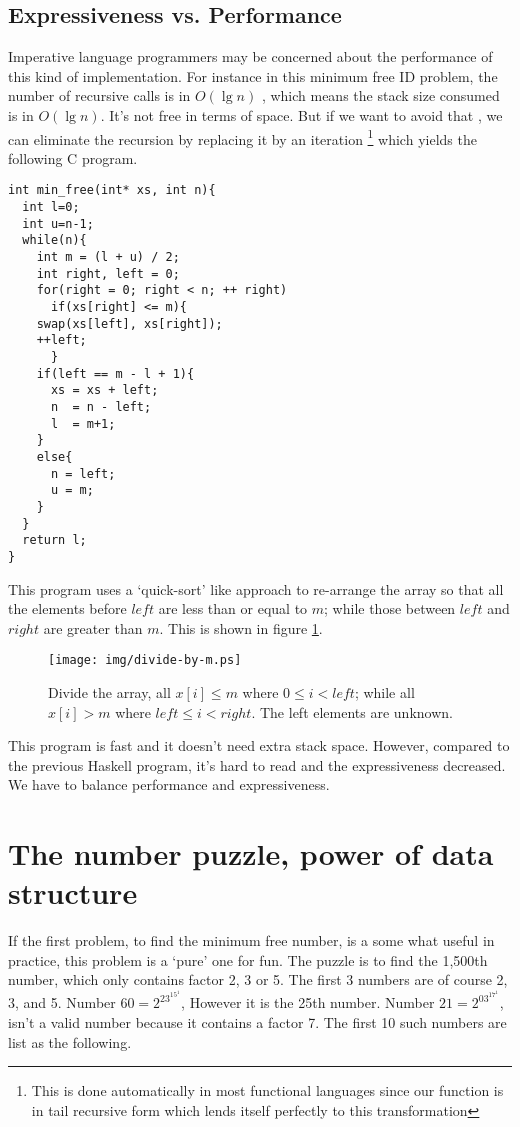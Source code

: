 \documentclass[UTF8]{article}
\begin{document}
\subsection{Expressiveness vs. Performance}
Imperative language programmers may be concerned about the performance
of this kind of implementation. For instance in this minimum
free ID problem, the number of recursive calls is in $O(\lg n)$
, which means the stack size consumed is in $O(\lg n)$.
It's not free in terms of space. But if we want to avoid that
, we can eliminate the recursion by replacing it by an iteration
\footnote{This is done automatically in most functional languages
since our function is in tail recursive form which lends itself
perfectly to this transformation} which yields the following C program.

\lstset{language=C}
\begin{lstlisting}
int min_free(int* xs, int n){
  int l=0;
  int u=n-1;
  while(n){
    int m = (l + u) / 2;
    int right, left = 0;
    for(right = 0; right < n; ++ right)
      if(xs[right] <= m){
	swap(xs[left], xs[right]);
	++left;
      }
    if(left == m - l + 1){
      xs = xs + left;
      n  = n - left;
      l  = m+1;
    }
    else{
      n = left;
      u = m;
    }
  }
  return l;
}
\end{lstlisting}

This program uses a `quick-sort' like approach to re-arrange the
array so that all the elements before $left$ are less than or equal
to $m$; while those between $left$ and $right$ are greater
than $m$. This is shown in figure \ref{fig:divide}.

\begin{figure}[htbp]
  \centering
  \texttt{[image: img/divide-by-m.ps]}
  \caption{Divide the array, all $x[i] \leq m$ where $0 \leq i < left$; while all $x[i] > m$ where $left \leq i < right$. The left elements are unknown.} \label{fig:divide}
\end{figure}

This program is fast and it doesn't need extra stack space. However,
compared to the previous Haskell program, it's hard to read and the
expressiveness decreased. We have to balance performance
and expressiveness.

\section{The number puzzle, power of data structure}

If the first problem, to find the minimum free number, is a some what
useful in practice, this problem is a `pure' one for fun. The puzzle
is to find the 1,500th number, which only contains factor 2, 3 or 5.
The first 3 numbers are of course 2, 3, and 5. Number $60 = 2^23^15^1$,
However it is the 25th number. Number $21 = 2^03^17^1$, isn't a valid
number because it contains a factor 7. The first 10 such numbers are list
as the following.
\end{document}
